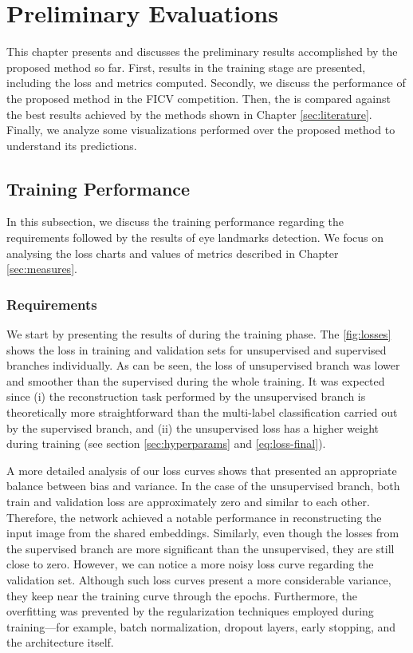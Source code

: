 \section{Preliminary Evaluations} \label{sec:results}

This chapter presents and discusses the preliminary results accomplished by the proposed method so far. First, \methodname results in the training stage are presented, including the loss and metrics computed. Secondly, we discuss the performance of the proposed method in the FICV competition. Then, the \methodname is compared against the best results achieved by the methods shown in Chapter \ref{sec:literature}. Finally, we analyze some visualizations performed over the proposed method to understand its predictions.

\subsection{Training Performance}

In this subsection, we discuss the training performance regarding the \icao requirements followed by the results of eye landmarks detection. We focus on analysing  the loss charts and values of metrics described in Chapter \ref{sec:measures}.

\subsubsection{Requirements}

We start by presenting the results of \methodname during the training phase. The \autoref{fig:losses} shows the loss in training and validation sets for unsupervised and supervised branches individually. As can be seen, the loss of unsupervised branch was lower and smoother than the supervised during the whole training. It was expected since (i) the reconstruction task performed by the unsupervised branch is theoretically more straightforward than the multi-label classification carried out by the supervised branch, and (ii) the unsupervised loss has a higher weight during training (see section \ref{sec:hyperparams} and \autoref{eq:loss-final}). 

A more detailed analysis of our loss curves shows that \methodname presented an appropriate balance between bias and variance. In the case of the unsupervised branch, both train and validation loss are approximately zero and similar to each other. Therefore, the network achieved a notable performance in reconstructing the input image from the shared embeddings. Similarly, even though the losses from the supervised branch are more significant than the unsupervised, they are still close to zero. However, we can notice a more noisy loss curve regarding the validation set. Although such loss curves present a more considerable variance, they keep near the training curve through the epochs. Furthermore, the overfitting was prevented by the regularization techniques employed during training—for example, batch normalization, dropout layers, early stopping, and the architecture itself.

